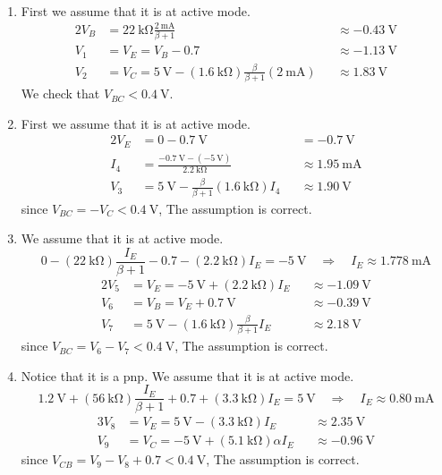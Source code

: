 \documentclass[12pt, a4paper]{article}
\begin{document}
\Ans \\

\begin{enumerate}
  \item 
    First we assume that it is at active mode.
    \begin{alignat*}{2}
      V_B &  = \SI{22}\kohm \frac{\SI{2}\mA}{\beta + 1} && \approx \SI{-0.43}{\V} \\
      V_1 &  = V_E = V_B - 0.7 &&\approx \SI{-1.13}\V \\
      V_2 &  = V_C = \SI{5}\V - (\SI{1.6}\kohm) \frac{\beta}{\beta + 1} (\SI{2}\mA) &&\approx \SI{1.83}\V
    \end{alignat*}
    We check that $V_{BC} < \SI{0.4}\V$.
  \item
    First we assume that it is at active mode.
    \begin{alignat*}{2}
      V_E & = 0 - \SI{0.7}\V &&= \SI{-0.7}\V \\
      I_4 & = \frac{ \SI{-0.7}{\V} - (\SI{-5}\V) }{ \SI{2.2}\kohm } 
      && \approx \SI{1.95}\mA \\
      V_3 & = \SI{5}\V - \frac{\beta}{\beta + 1} (\SI{1.6}\kohm) I_4 
      && \approx \SI{1.90}\V 
    \end{alignat*}
    since $V_{BC} = -V_C < \SI{0.4}\V$, The assumption is correct.
  \item
    We assume that it is at active mode.
    \[
      0 - (\SI{22}{\kohm}) \frac{I_E}{\beta + 1} - 0.7 - (\SI{2.2}\kohm) I_E = \SI{-5}{\V} \quad \Rightarrow \quad I_E \approx \SI{1.778}\mA
    \]
    \begin{alignat*}{2}
      V_5 & = V_E = -\SI{5}\V + (\SI{2.2}\kohm) I_E && \approx \SI{-1.09}\V\\
      V_6 & = V_B = V_E + \SI{0.7}\V && \approx \SI{-0.39}\V \\
      V_7 & = \SI{5}\V - (\SI{1.6}\kohm) \frac{\beta}{\beta + 1} I_E && \approx \SI{2.18}\V
    \end{alignat*}
    since $V_{BC} = V_6 - V_7 < \SI{0.4}\V$, The assumption is correct.

  \item Notice that it is a pnp. We assume that it is at active mode.
    \[
      \SI{1.2}\V + (\SI{56}{\kohm}) \frac{I_E}{\beta + 1} + 0.7 + (\SI{3.3}\kohm) I_E = \SI{5}{\V} \quad \Rightarrow \quad I_E \approx \SI{0.80}\mA
    \]
    \begin{alignat*}{3}
      V_8 & = V_E = \SI{5}\V - (\SI{3.3}\kohm)  I_E && \approx \SI{2.35}\V \\
      V_9 & = V_C = -\SI{5}\V + (\SI{5.1}\kohm) \alpha I_E && \approx \SI{-0.96}\V
    \end{alignat*}
    since $V_{CB} = V_9 - V_8 + 0.7 < \SI{0.4}\V$, The assumption is correct.


\end{enumerate}
\end{document}
